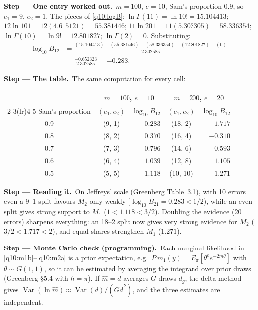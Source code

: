 \documentclass[11pt,a4paper]{article}
\numberwithin{equation}{questao}   %
\newcommand{\passo}[2]{\par\smallskip\noindent\textbf{Step --- #1.}~#2}
\newcommand{\Var}{\operatorname{Var}}
\newcommand{\1}{\mathbf{1}}
\begin{document}
\begin{sol}
\passo{One entry worked out}{$m=100$, $e=10$, Sam's proportion $0.9$, so $e_1=9$, $e_2=1$. The
pieces of \eqref{q10:logB}: $\ln\Gamma(11)=\ln10!=15.104413$; $12\ln101=12(4.615121)=55.381446$;
$11\ln201=11(5.303305)=58.336354$; $\ln\Gamma(10)=\ln9!=12.801827$; $\ln\Gamma(2)=0$. Substituting:}
\begin{align}
\log_{10}B_{12}&=\frac{(15.104413)+(55.381446)-(58.336354)-(12.801827)-(0)}{2.302585}\label{q10:w1}\\
&=\frac{-0.652323}{2.302585}=-0.283.\label{q10:w2}
\end{align}

\passo{The table}{The same computation for every cell:}
\begin{center}
\begin{tabular}{ccrcr}
\toprule
& \multicolumn{2}{c}{$m=100$, $e=10$} & \multicolumn{2}{c}{$m=200$, $e=20$}\\
\cmidrule(lr){2-3}\cmidrule(lr){4-5}
Sam's proportion & $(e_1,e_2)$ & $\log_{10}B_{12}$ & $(e_1,e_2)$ & $\log_{10}B_{12}$\\
\midrule
0.9 & (9, 1) & $-0.283$ & (18, 2) & $-1.717$\\
0.8 & (8, 2) & $0.370$ & (16, 4) & $-0.310$\\
0.7 & (7, 3) & $0.796$ & (14, 6) & $0.593$\\
0.6 & (6, 4) & $1.039$ & (12, 8) & $1.105$\\
0.5 & (5, 5) & $1.118$ & (10, 10) & $1.271$\\
\bottomrule
\end{tabular}
\end{center}

\passo{Reading it}{On Jeffreys' scale (Greenberg Table~3.1), with 10 errors even a 9--1 split
favours $M_2$ only weakly ($\log_{10}B_{21}=0.283<1/2$), while an even split gives strong support to
$M_1$ ($1<1.118<3/2$). Doubling the evidence (20 errors) sharpens everything: an 18--2 split now
gives very strong evidence for $M_2$ ($3/2<1.717<2$), and equal shares strengthen $M_1$ ($1.271$).}

\passo{Monte Carlo check (programming)}{Each marginal likelihood in \eqref{q10:m1b}--\eqref{q10:m2a}
is a prior expectation, e.g.\ $P\,m_1(y)=E_{\pi}[\theta^{e}e^{-2m\theta}]$ with $\theta\sim G(1,1)$, so it
can be estimated by averaging the integrand over prior draws (Greenberg §5.4 with $h=\pi$). If
$\hat m=\bar d$ averages $G$ draws $d_g$, the delta method gives
$\Var(\ln\hat m)\approx\Var(d)/(G\bar d^{\,2})$, and the three estimates are independent.}


\end{sol}
\end{document}
